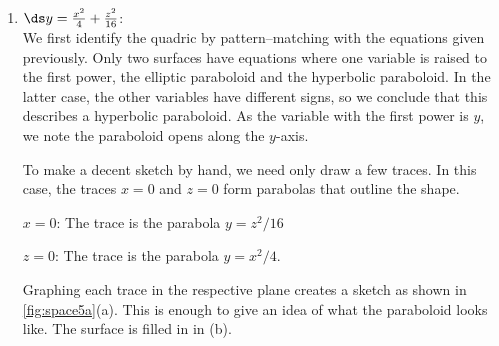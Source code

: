 {\mbox{}\\[-\baselineskip]\begin{enumerate}
	\item $\ds y=\frac{x^2}{4}+\frac{z^2}{16}$:\\
	We first identify the quadric by pattern--matching with the equations given previously. Only two surfaces have equations where one variable is raised to the first power, the elliptic paraboloid and the hyperbolic paraboloid. In the latter case, the other variables have different signs, so we conclude that this describes a hyperbolic paraboloid. As the variable with the first power is $y$, we note the paraboloid opens along the $y$-axis. 
	
	To make a decent sketch by hand, we need only draw a few traces. In this case, the traces $x=0$ and $z=0$ form parabolas that outline the shape.
	
	$x=0$:	The trace is the parabola $y=z^2/16$
	
	$z=0$: 	The trace is the parabola $y=x^2/4$.
	
	Graphing each trace in the respective plane creates a sketch as shown in \autoref{fig:space5a}(a). This is enough to give an idea of what the paraboloid looks like. The surface is filled in in (b).
	

\end{enumerate}}
